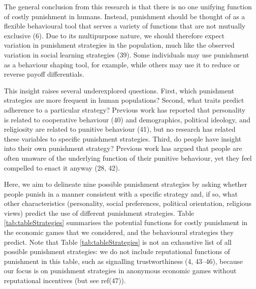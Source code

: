 \documentclass[
  english,
  man, donotrepeattitle,floatsintext]{apa6}
\begin{document}
The general conclusion from this research is that there is no one unifying
function of costly punishment in humans. Instead, punishment should be thought
of as a flexible behavioural tool that serves a variety of functions that are
not mutually exclusive (6). Due to its multipurpose nature, we should
therefore expect variation in punishment strategies in the population, much like
the observed variation in social learning strategies (39). Some
individuals may use punishment as a behaviour shaping tool, for example, while
others may use it to reduce or reverse payoff differentials.

This insight raises several underexplored questions. First, which punishment
strategies are more frequent in human populations? Second, what traits predict
adherence to a particular strategy? Previous work has reported that personality
is related to cooperative behaviour (40) and demographics, political
ideology, and religiosity are related to punitive behaviour (41), but
no research has related these variables to specific punishment strategies.
Third, do people have insight into their own punishment strategy? Previous work
has argued that people are often unaware of the underlying function of their
punitive behaviour, yet they feel compelled to enact it anyway
(28, 42).

Here, we aim to delineate nine possible punishment strategies by asking
whether people punish in a manner consistent with a specific strategy and, if
so, what other characteristics (personality, social preferences, political
orientation, religious views) predict the use of different punishment strategies.
Table \ref{tab:tableStrategies} summarises the potential functions for costly
punishment in the economic games that we considered, and the behavioural
strategies they predict. Note that Table \ref{tab:tableStrategies} is not
an exhaustive list of all possible punishment strategies: we do not include
reputational functions of punishment in this table, such as signalling
trustworthiness (4, 43--46),
because our focus is on punishment strategies in anonymous economic games without
reputational incentives (but see ref(47)).
\end{document}
